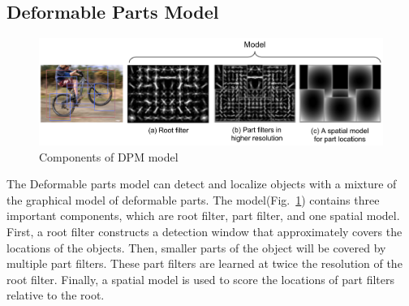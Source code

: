 \documentclass[letterpaper]{article} %
\begin{document}
\subsection{Deformable Parts Model}
\begin{figure}[ht]
\hspace{-13mm}
\centering
\includegraphics[width=1.0\linewidth,height = 0.3\linewidth]{Figure/DPM_1.png}
\caption{\footnotesize{Components of DPM model}}
\label{fig:DPMcomp}
\vspace{0mm}
\end{figure}
\noindent The Deformable parts model can detect and localize objects with a mixture of the graphical model of deformable parts\cite{DPM}. The model(Fig.~\ref{fig:DPMcomp}) contains three important components, which are root filter, part filter, and one spatial model. First, a root filter constructs a detection window that approximately covers the locations of the objects. Then, smaller parts of the object will be covered by multiple part filters. These part filters are learned at twice the resolution of the root filter. Finally, a spatial model is used to score the locations of part filters relative to the root.\\
\end{document}

